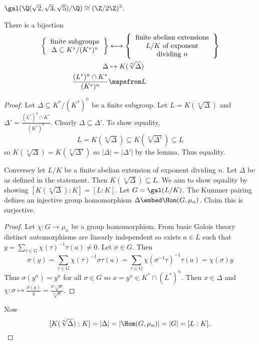 \documentclass[a4paper]{article}
\theoremstyle{definition}
\theoremstyle{theorem}
\begin{document}
\begin{eg}
  \(\gal(\Q(\sqrt 2, \sqrt 3, \sqrt 5)/\Q) \cong (\Z/2\Z)^3\).
\end{eg}

\begin{theorem}
  There is a bijection
  \begin{align*}
    \left\{
    \begin{tabular}{c}
      finite subgroups \\
      \(\Delta \subseteq K^*/(K^*)^n\)
    \end{tabular}
    \right\}
    &\longleftrightarrow
      \left\{
      \begin{tabular}{c}
        finite abelian extensions \\
        \(L/K\) of exponent \\
        dividing \(n\)
      \end{tabular}
    \right\} \\
    \Delta &\mapsto K(\sqrt[n] \Delta) \\
    \frac{(L^*)^n \cap K^*}{(K^*)^n} &\mapsfrom L
  \end{align*}
\end{theorem}

\begin{proof}
  Let \(\Delta \subseteq K^*/(K^*)^n\) be a finite subgroup. Let \(L = K(\sqrt[n]\Delta)\) and \(\Delta' = \frac{(L^*)^n \cap K^*}{(K^*)^n}\). Clearly \(\Delta \subseteq \Delta'\). To show equality,
  \[
    L = K(\sqrt[n]\Delta) \subseteq K(\sqrt[n]{\Delta'}) \subseteq L
  \]
  so \(K(\sqrt[n]\Delta) = K(\sqrt[n]{\Delta'})\) so \(|\Delta| = |\Delta'|\) by the lemma. Thus equality.

  Conversey let \(L/K\) be a finite abelian extension of exponent dividing \(n\). Let \(\Delta\) be as defined in the statement. Then \(K(\sqrt[n]{\Delta}) \subseteq L\). We aim to show equality by showing \([K(\sqrt[n]{\Delta}) : K] = [L : K]\). Let \(G = \gal(L/K)\). The Kummer pairing defines an injective group homomorphism \(\Delta \embed \Hom(G, \mu_n)\). Claim this is surjective.

  \begin{proof}
    Let \(\chi: G \to \mu_n\) be a group homomorphism. From basic Galois theory distinct automorphisms are linearly independent so exists \(a \in L\) such that \(y = \sum_{\tau \in G} \chi(\tau)^{-1} \tau(a) \neq 0\). Let \(\sigma \in G\). Then
    \[
      \sigma(y)
      = \sum_{\tau \in G} \chi(\tau)^{-1} \sigma \tau(a)
      = \sum_{\tau \in G} \chi(\sigma^{-1} \tau)^{-1} \tau(a)
      = \chi(\sigma) y
    \]
    Thus \(\sigma(y^n) = y^n\) for all \(\sigma \in G\) so \(x = y^n \in K^* \cap (L^*)^n\). Then \(x \in \Delta\) and \(\chi: \sigma \mapsto \frac{\sigma(y)}{y} = \frac{\sigma \sqrt[n]{x}}{\sqrt[n]{x}}\).
  \end{proof}

  Now
  \[
    [K(\sqrt[n]{\Delta}) : K] = |\Delta| = |\Hom(G, \mu_n)| = |G| = [L : K].
  \]
\end{proof}
\end{document}
